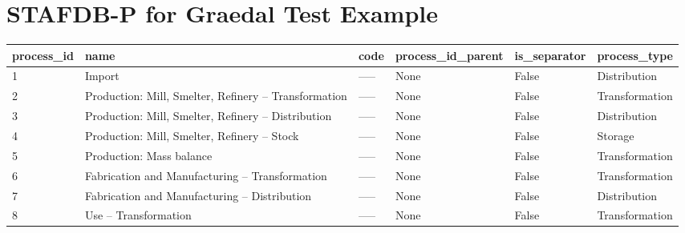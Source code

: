 \documentclass[ %
                    author={Tom Jager},
                supervisor={Dr. Daniel Schien},
                    degree={MEng},
                     title={A Bayesian Inference Engine for Calibrating Uncertainty over UMIS Structured MFA Systems},
                  subtitle={},
                      type={research},
                      year={2019} ]{dissertation}
\begin{document}
\section{STAFDB-P for Graedal Test Example}
\label{app:stafdb_p_graedal}
\begin{table}
\center
\begin{tabular}{|l|p{4.5cm}|l|l|l|l|}
\hline
{ \textbf{process\_id}} & { \textbf{name}}                                  & { \textbf{code}} & { \textbf{process\_id\_parent}} & { \textbf{is\_separator}} & { \textbf{process\_type}} \\ \hline
1                          & Import                                               & -----               & None                               & False                        & Distribution                 \\ \hline
2                          & Production: Mill, Smelter, Refinery – Transformation & -----               & None                               & False                        & Transformation               \\ \hline
3                          & Production: Mill, Smelter, Refinery – Distribution   & -----               & None                               & False                        & Distribution                 \\ \hline
4                          & Production: Mill, Smelter, Refinery – Stock          & -----               & None                               & False                        & Storage                      \\ \hline
5                          & Production: Mass balance                             & -----               & None                               & False                        & Transformation               \\ \hline
6                          & Fabrication and Manufacturing – Transformation       & -----               & None                               & False                        & Transformation               \\ \hline
7                          & Fabrication and Manufacturing – Distribution         & -----               & None                               & False                        & Distribution                 \\ \hline
8                          & Use – Transformation                                 & -----               & None                               & False                        & Transformation               \\ \hline

\end{tabular}
\end{table}
\end{document}
